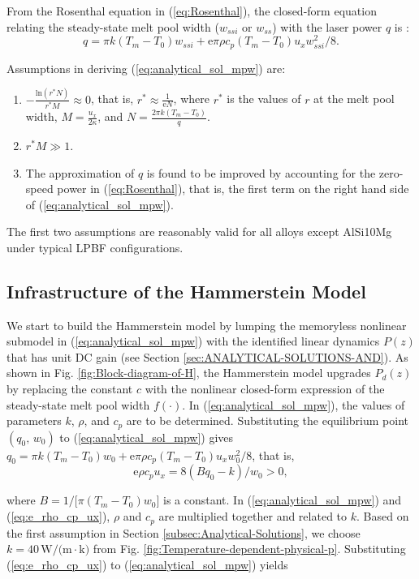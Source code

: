 \documentclass [11pt, proquest] {uwthesis}[2020/02/24]
\begin{document}
From the Rosenthal equation in (\ref{eq:Rosenthal}), the closed-form
equation relating the steady-state melt pool width ($w_{ssi}$ or
$w_{ss}$) with the laser power $q$ is \cite{tang2017prediction}:
\noindent 
\begin{equation}
q=\pi k(T_{m}-T_{0})w_{ssi}+\text{e}\pi\rho c_{p}(T_{m}-T_{0})u_{x}w_{ssi}^{2}/8.\label{eq:analytical_sol_mpw}
\end{equation}

Assumptions in deriving (\ref{eq:analytical_sol_mpw}) are:
\begin{enumerate}
\item $-\frac{\text{ln}(r^{*}N)}{r^{*}M}\approx0$, that is, $r^{*}\approx\frac{1}{\text{e}N}$,
where $r^{*}$ is the values of $r$ at the melt pool width, $M=\frac{u_{x}}{2\kappa}$,
and $N=\frac{2\pi k(T_{m}-T_{0})}{q}$. 
\item $r^{*}M\gg1$.
\item The approximation of $q$ is found to be improved by accounting for
the zero-speed power in (\ref{eq:Rosenthal}), that is, the first
term on the right hand side of (\ref{eq:analytical_sol_mpw}). 
\end{enumerate}
The first two assumptions are reasonably valid for all alloys except
AlSi10Mg under typical LPBF configurations.

\subsection{Infrastructure of the Hammerstein Model}

We start to build the Hammerstein model by lumping the memoryless
nonlinear submodel in (\ref{eq:analytical_sol_mpw}) with the identified
linear dynamics $P(z)$ that has unit DC gain (see Section \ref{sec:ANALYTICAL-SOLUTIONS-AND}).
As shown in Fig. \ref{fig:Block-diagram-of-H}, the Hammerstein model
upgrades $P_{d}(z)$ by replacing the constant $c$ with the nonlinear
closed-form expression of the steady-state melt pool width $f(\cdot)$.
In (\ref{eq:analytical_sol_mpw}), the values of parameters $k$,
$\rho$, and $c_{p}$ are to be determined. Substituting the equilibrium point $(q_{0},\,w_{0})$ to (\ref{eq:analytical_sol_mpw})
gives $q_{0}=\pi k(T_{m}-T_{0})w_{0}+\text{e}\pi\rho c_{p}(T_{m}-T_{0})u_{x}w_{0}^{2}/8$,
that is,
\noindent 
\begin{equation}
\text{e}\rho c_{p}u_{x}=8(Bq_{0}-k)/w_{0}>0,\label{eq:e_rho_cp_ux}
\end{equation}

\noindent where $B=1/\text{[}\pi(T_{m}-T_{0})w_{0}]$ is a constant.
In (\ref{eq:analytical_sol_mpw}) and (\ref{eq:e_rho_cp_ux}), $\rho$
and $c_{p}$ are multiplied together and related to $k$. Based on
the first assumption in Section \ref{subsec:Analytical-Solutions},
we choose $k=40\,\text{W/(m}\cdot\text{k)}$ from Fig. \ref{fig:Temperature-dependent-physical-p}.
Substituting (\ref{eq:e_rho_cp_ux}) to (\ref{eq:analytical_sol_mpw})
yields
\end{document}
